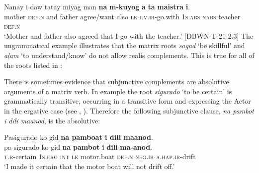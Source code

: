 \gll Nanay  i  daw  tatay  miyag  man  \textbf{na}  \textbf{m-kuyog}  \textbf{a}  \textbf{ta}  \textbf{maistra}  \textbf{i}. \\
mother  \textsc{def.n}  and  father   agree/want  also  \textsc{lk}  \textsc{i.v.ir}-go.with  1\textsc{s.abs}  \textsc{nabs}  teacher \textsc{def.n} \\
\glt ‘Mother and father also agreed that I go with the teacher.’ [DBWN-T-21 2.3]
\z
The ungrammatical example  illustrates that the matrix roots \textit{sagad} `be skillful' and \textit{aļam} `to understand/know' do not allow realis complements. This is true for all of the roots listed in :

\ea
    \z
\z

There is sometimes evidence that subjunctive complements are absolutive arguments of a matrix verb. In example  the root \textit{sigurado} ‘to be certain’ is grammatically transitive, occurring in a transitive form and expressing the Actor in the ergative case (see , ). Therefore the following subjunctive clause, \textit{na pambot i dili maanod}, is the absolutive:

\ea
\label{ex:notdriftoff}
Pasigurado ko gid \textbf{na pamboat i dili maanod}. \\
\gll pa-sigurado	ko	gid	\textbf{na}	\textbf{pambot}		\textbf{i}	\textbf{dili}	\textbf{ma-anod}. \\
\textsc{t.r}-certain	1\textsc{s.erg}	\textsc{int}	\textsc{lk}	motor.boat	\textsc{def.n}	\textsc{neg.ir}	\textsc{a.hap.ir}-drift \\
\glt ‘I made it certain that the motor boat will not drift off.’
\z

